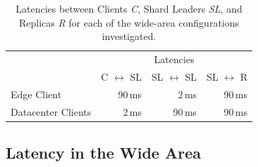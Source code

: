 


\begin{table}[b]
\begin{tabular}{@{}lrrr@{}}
& \multicolumn{3}{c}{Latencies}  \\
& C $\leftrightarrow$ SL & SL $\leftrightarrow$ SL & SL $\leftrightarrow$ R  \\
Edge Client  & 90\,ms  & 2\,ms & 90\,ms  \\
Datacenter Clients    & 2\,ms & 90\,ms & 90\,ms 
\end{tabular}
\vspace{4pt}
\caption{Latencies between Clients \textit{C}, Shard Leaders \textit{SL}, and Replicas \textit{R} for each of the wide-area configurations investigated.}
\label{table:wan}
\end{table}

\subsection{Latency in the Wide Area}


